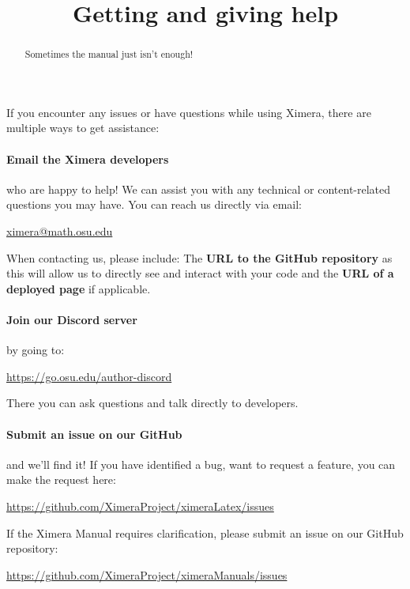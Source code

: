 \documentclass{ximera}
\title{Getting and giving help}
\begin{document}
\begin{abstract}
    Sometimes the manual just isn't enough!
\end{abstract}
\maketitle

If you encounter any issues or have questions while using Ximera, there are
multiple ways to get assistance:

\paragraph{Email the Ximera developers} who are happy to help! We can assist
you with any technical or content-related questions you may have. You can reach
us directly via email:
\begin{center}
    \url{ximera@math.osu.edu}
\end{center}

When contacting us, please include: The \textbf{URL to the GitHub repository}
as this will allow us to directly see and interact with your code and the
\textbf{URL of a deployed page} if applicable.

\paragraph{Join our Discord server} by going to:
\begin{center}
    \url{https://go.osu.edu/author-discord}
\end{center}
There you can ask questions and talk directly to developers.

\paragraph{Submit an issue on our GitHub} and we'll find it!
If you have identified a bug, want to request a feature, you can make the
request here:
\begin{center}
    \url{https://github.com/XimeraProject/ximeraLatex/issues}
\end{center}
If the Ximera Manual requires clarification, please submit an issue on our
GitHub repository:

\begin{center}
    \url{https://github.com/XimeraProject/ximeraManuals/issues}
\end{center}
\end{document}
